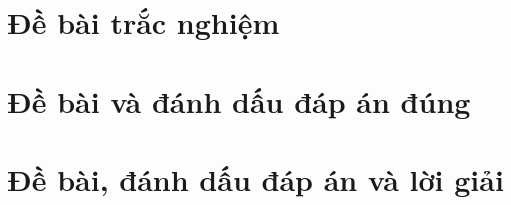 \documentclass[12pt]{article}
\newenvironment{khung}{%
  \def\FrameCommand{\fcolorbox{black}{shadecolor}}%
  \MakeFramed {\advance\hsize-\width \FrameRestore}%
  }%
{\endMakeFramed}
\def\dkhung{
\begin{khung}
\noindent\theverbbox[t]
\end{khung}
}
\begin{document}
 
\newpage
\section{Đề bài trắc nghiệm}
\begin{verbbox}
\indebai
\begin{enumerate}
\foreachproblem[bttracnghiem]{\item\causo\thisproblem}
\end{enumerate}
\end{verbbox}
\dkhung

\indebai
\begin{enumerate}[]
\foreachproblem[bttracnghiem]{\item\causo\thisproblem}
\end{enumerate}

\newpage
\section{Đề bài và đánh dấu đáp án đúng}
\begin{verbbox}
\setcounter{page}{1}
\indebaidapan
\begin{enumerate}[]
\foreachproblem[bttracnghiem]{\item\causo\thisproblem}
\end{enumerate}
\end{verbbox}
\dkhung

\setcounter{page}{1}
\indebaidapan
\begin{enumerate}[]
\foreachproblem[bttracnghiem]{\item\causo\thisproblem}
\end{enumerate}

\newpage
\section{Đề bài, đánh dấu đáp án và lời giải}
\begin{verbbox}
\setcounter{page}{1}
\indebailoigiai
\begin{enumerate}[]
\foreachproblem[bttracnghiem]{\item\causo\thisproblem}
\end{enumerate}
\end{verbbox}
\dkhung

\setcounter{page}{1}
\indebailoigiai
\begin{enumerate}[]
\foreachproblem[bttracnghiem]{\item\causo\thisproblem}
\end{enumerate}
\end{document}
